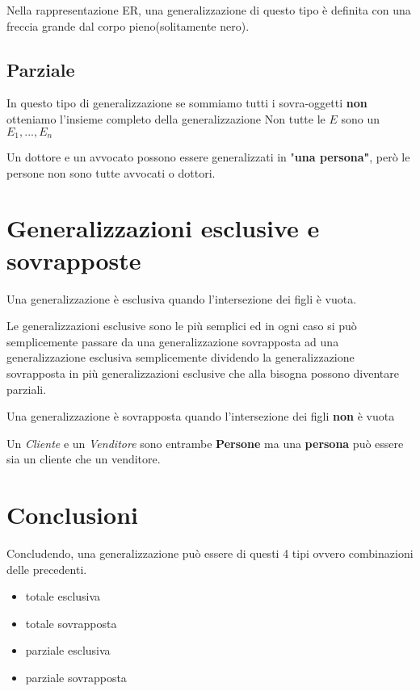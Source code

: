 Nella rappresentazione ER, una generalizzazione di questo tipo è definita con una freccia grande dal corpo pieno(solitamente nero).

\subsection{Parziale}

In questo tipo di generalizzazione se sommiamo tutti i sovra-oggetti \textbf{non} otteniamo l'insieme completo della generalizzazione
Non tutte le $E$ sono un $E_1, ..., E_n$

\begin{exmp}
Un dottore e un avvocato possono essere generalizzati in "\textbf{una persona"}, però le persone non sono tutte avvocati o dottori.
\end{exmp}

\section{Generalizzazioni esclusive e sovrapposte}

Una generalizzazione è esclusiva quando l'intersezione dei figli è vuota.

Le generalizzazioni esclusive sono le più semplici ed in ogni caso si può semplicemente passare da una generalizzazione sovrapposta ad una generalizzazione esclusiva semplicemente dividendo la generalizzazione sovrapposta in più generalizzazioni esclusive che alla bisogna possono diventare parziali.

Una generalizzazione è sovrapposta quando l'intersezione dei figli \textbf{non} è vuota
\begin{exmp}
    Un \textit{Cliente} e un \textit{Venditore} sono entrambe \textbf{Persone} ma una \textbf{persona} può essere sia un cliente che un venditore.
\end{exmp}

\section{Conclusioni}

Concludendo, una generalizzazione può essere di questi 4 tipi ovvero combinazioni delle precedenti.

\begin{itemize}
    \item totale esclusiva
    \item totale sovrapposta
    \item parziale esclusiva
    \item parziale sovrapposta
\end{itemize}